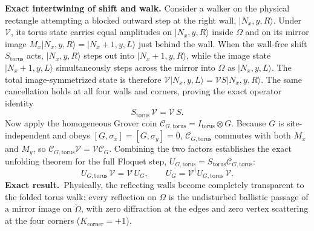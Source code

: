\documentclass[11pt,a4paper,oneside]{report}
\newcommand{\ket}[1]{\lvert #1\rangle}
\newcommand{\CC}{\mathcal C}
\newcommand{\Id}{I}
\newcommand{\exact}{\textbf{Exact result.}\ }
\numberwithin{equation}{chapter}
\begin{document}
\textbf{Exact intertwining of shift and walk.} Consider a walker on the
physical rectangle attempting a blocked outward step at the right wall,
\(\ket{N_x,y,R}\). Under \(\mathcal V\), its torus state carries equal
amplitudes on \(\ket{N_x,y,R}\) inside \(\Omega\) and on its mirror image
\(M_x\ket{N_x,y,R}=\ket{N_x+1,y,L}\) just behind the wall. When the
wall-free shift \(S_{\mathrm{torus}}\) acts, \(\ket{N_x,y,R}\) steps out
into \(\ket{N_x+1,y,R}\), while the image state \(\ket{N_x+1,y,L}\)
simultaneously steps across the mirror into \(\Omega\) as \(\ket{N_x,y,L}\).
The total image-symmetrized state is therefore \(\mathcal V\ket{N_x,y,L}
=\mathcal V S\ket{N_x,y,R}\). The same cancellation holds at all four walls
and corners, proving the exact operator identity
\begin{equation}
S_{\mathrm{torus}}\,\mathcal V=\mathcal V\,S.
\end{equation}
Now apply the homogeneous Grover coin
\(\CC_{G,\mathrm{torus}}=\Id_{\mathrm{torus}}\otimes G\). Because \(G\) is
site-independent and obeys \([G,\sigma_x]=[G,\sigma_y]=0\),
\(\CC_{G,\mathrm{torus}}\) commutes with both \(M_x\) and \(M_y\), so
\(\CC_{G,\mathrm{torus}}\mathcal V=\mathcal V\CC_G\). Combining the two
factors establishes the exact unfolding theorem for the full Floquet step,
\(U_{G,\mathrm{torus}}=S_{\mathrm{torus}}\CC_{G,\mathrm{torus}}\):
\begin{equation}
\boxed{
U_{G,\mathrm{torus}}\,\mathcal V=\mathcal V\,U_G,
\qquad
U_G=\mathcal V^\dagger U_{G,\mathrm{torus}}\,\mathcal V.
}
\label{eq:unfolding}
\end{equation}
\exact Physically, the reflecting walls become completely transparent to the
folded torus walk: every reflection on \(\Omega\) is the undisturbed
ballistic passage of a mirror image on \(\widetilde\Omega\), with zero
diffraction at the edges and zero vertex scattering at the four corners
(\(K_{\mathrm{corner}}=+1\)).
\end{document}
